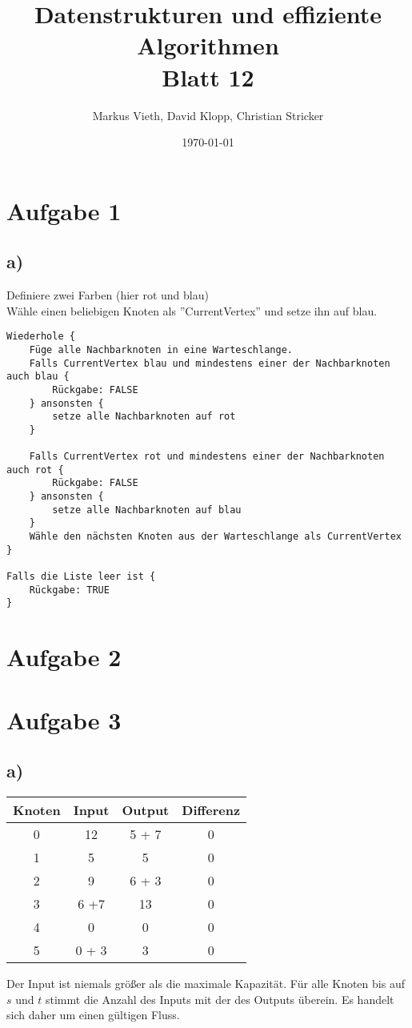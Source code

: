 \documentclass[a4paper,11pt,twoside]{scrartcl}
\title{Datenstrukturen und effiziente Algorithmen\\ Blatt 12}
\author{Markus Vieth, David Klopp, Christian Stricker}
\date{\today}
\begin{document}
\maketitle
\cleardoublepage
\pagestyle{myheadings}

\section*{Aufgabe 1}
\subsection*{a)} 
Definiere zwei Farben (hier rot und blau)\\
Wähle einen beliebigen Knoten als ''CurrentVertex'' und setze ihn auf blau.\\

\begin{lstlisting}
Wiederhole {
	Füge alle Nachbarknoten in eine Warteschlange.
	Falls CurrentVertex blau und mindestens einer der Nachbarknoten auch blau {
		Rückgabe: FALSE
	} ansonsten {
		setze alle Nachbarknoten auf rot
	}
	
	Falls CurrentVertex rot und mindestens einer der Nachbarknoten auch rot {
		Rückgabe: FALSE
	} ansonsten {
		setze alle Nachbarknoten auf blau
	}
	Wähle den nächsten Knoten aus der Warteschlange als CurrentVertex
}

Falls die Liste leer ist {
	Rückgabe: TRUE
}
\end{lstlisting}

\section*{Aufgabe 2}


\section*{Aufgabe 3}
\subsection*{a)} 

\begin{center}
  \begin{tabular}{| c || c | c | c |}
    \hline
    Knoten & Input & Output & Differenz\\ \hline
    0 & 12     & 5 + 7 & 0 \\ \hline
    1 & 5       & 5       & 0 \\ \hline
    2 &  9      & 6 + 3 & 0 \\ \hline
    3 & 6 +7  & 13     & 0 \\ \hline
    4 & 0       & 0       & 0 \\ \hline
    5 & 0 + 3 & 3       & 0 \\ \hline
  \end{tabular}
\end{center}
Der Input ist niemals größer als die maximale Kapazität. Für alle Knoten bis auf $s$ und $t$ stimmt die Anzahl des Inputs mit der des Outputs  überein. Es handelt sich daher um einen gültigen Fluss.
\end{document}
